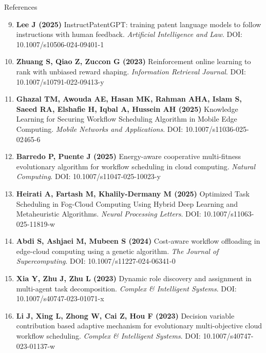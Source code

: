 \documentclass[aspectratio=169,10pt]{beamer}
\begin{document}
\begin{frame}{References}
\scriptsize
{}
\begin{enumerate}\setcounter{enumi}{8}\itemsep0.28em\leftskip=-0.55em
\item \textbf{Lee J (2025)} InstructPatentGPT: training patent language models to follow instructions with human feedback. \textit{Artificial Intelligence and Law}. DOI: 10.1007/s10506-024-09401-1
\item \textbf{Zhuang S, Qiao Z, Zuccon G (2023)} Reinforcement online learning to rank with unbiased reward shaping. \textit{Information Retrieval Journal}. DOI: 10.1007/s10791-022-09413-y
\item \textbf{Ghazal TM, Awouda AE, Hasan MK, Rahman AHA, Islam S, Saeed RA, Elshafie H, Iqbal A, Hussein AH (2025)} Knowledge Learning for Securing Workflow Scheduling Algorithm in Mobile Edge Computing. \textit{Mobile Networks and Applications}. DOI: 10.1007/s11036-025-02465-6
\item \textbf{Barredo P, Puente J (2025)} Energy-aware cooperative multi-fitness evolutionary algorithm for workflow scheduling in cloud computing. \textit{Natural Computing}. DOI: 10.1007/s11047-025-10023-y
\item \textbf{Heirati A, Fartash M, Khalily-Dermany M (2025)} Optimized Task Scheduling in Fog-Cloud Computing Using Hybrid Deep Learning and Metaheuristic Algorithms. \textit{Neural Processing Letters}. DOI: 10.1007/s11063-025-11819-w
\item \textbf{Abdi S, Ashjaei M, Mubeen S (2024)} Cost-aware workflow offloading in edge-cloud computing using a genetic algorithm. \textit{The Journal of Supercomputing}. DOI: 10.1007/s11227-024-06341-0
\item \textbf{Xia Y, Zhu J, Zhu L (2023)} Dynamic role discovery and assignment in multi-agent task decomposition. \textit{Complex \& Intelligent Systems}. DOI: 10.1007/s40747-023-01071-x
\item \textbf{Li J, Xing L, Zhong W, Cai Z, Hou F (2023)} Decision variable contribution based adaptive mechanism for evolutionary multi-objective cloud workflow scheduling. \textit{Complex \& Intelligent Systems}. DOI: 10.1007/s40747-023-01137-w
\end{enumerate}
\end{frame}
\end{document}
